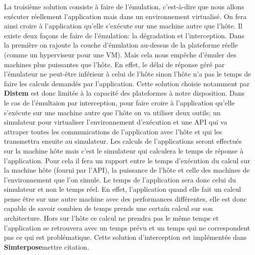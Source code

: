 La troisième solution consiste à faire de l'émulation, c'est-à-dire que nous allons exécuter réellement l'application mais dans un environnement virtualisé. On fera ainsi croire à l'application qu'elle s'exécute sur une machine autre que l'hôte. Il existe deux façons de faire de l'émulation: la dégradation et l'interception. Dans la première on rajoute la couche d'émulation au-dessus de la plateforme réelle (comme un hyperviseur pour une VM). Mais cela nous empêche d'émuler des machines plus puissantes que l'hôte. En effet, le délai de réponse géré par l'émulateur ne peut-être inférieur à celui de l'hôte sinon l'hôte n'a pas le temps de faire les calculs demandés par l'application. Cette solution choisie notamment par \textbf{Distem}\cite{EMULATION:Distem} est donc limitée à la capacité des plateformes à notre disposition. Dans le cas de l'émultaion par interception, pour faire croire à l'application qu'elle s'exécute sur une machine autre que l'hôte on va utiliser deux outils; un simulateur pour virtualiser l'environnement d'exécution et une API qui va attraper toutes les communications de l'application avec l'hôte et qui les transmettra ensuite au simulateur. Les calculs de l'applications seront effectués sur la machine hôte mais c'est le simulateur qui calculera le temps de réponse à l'application. Pour cela il fera un rapport entre le temps d'exécution du calcul sur la machine hôte (fourni par l'API), la puissance de l'hôte et celle des machines de l'environnement que l'on simule. Le temps de l'application sera donc celui du simulateur et non le temps réel. En effet, l'application quand elle fait un calcul pense être sur une autre machine avec des performances différentes, elle est donc capable de savoir combien de temps prends une certain calcul sur son architecture. Hors sur l'hôte ce calcul ne prendra pas le même temps et l'application se retrouvera avec un temps prévu et un temps qui ne correspondent pas ce qui est problématique. Cette solution d'interception est implémentée dans \textbf{Simterpose}{\color{red}mettre citation}.


